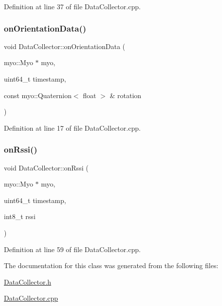 Definition at line 37 of file Data\+Collector.\+cpp.

\mbox{\label{class_data_collector_a7e54df882eed064e4059b3361dff796f}} 
\subsubsection{\texorpdfstring{on\+Orientation\+Data()}{onOrientationData()}}
{\footnotesize\ttfamily void Data\+Collector\+::on\+Orientation\+Data (\begin{DoxyParamCaption}\item[{myo\+::\+Myo $\ast$}]{myo,  }\item[{uint64\+\_\+t}]{timestamp,  }\item[{const myo\+::\+Quaternion$<$ float $>$ \&}]{rotation }\end{DoxyParamCaption})}



Definition at line 17 of file Data\+Collector.\+cpp.

\mbox{\label{class_data_collector_aff0d95e10b014c460bf859abd6a01f74}} 
\subsubsection{\texorpdfstring{on\+Rssi()}{onRssi()}}
{\footnotesize\ttfamily void Data\+Collector\+::on\+Rssi (\begin{DoxyParamCaption}\item[{myo\+::\+Myo $\ast$}]{myo,  }\item[{uint64\+\_\+t}]{timestamp,  }\item[{int8\+\_\+t}]{rssi }\end{DoxyParamCaption})}



Definition at line 59 of file Data\+Collector.\+cpp.



The documentation for this class was generated from the following files\+:\begin{DoxyCompactItemize}
\item 
\mbox{\hyperlink{_data_collector_8h}{Data\+Collector.\+h}}\item 
\mbox{\hyperlink{_data_collector_8cpp}{Data\+Collector.\+cpp}}\end{DoxyCompactItemize}
